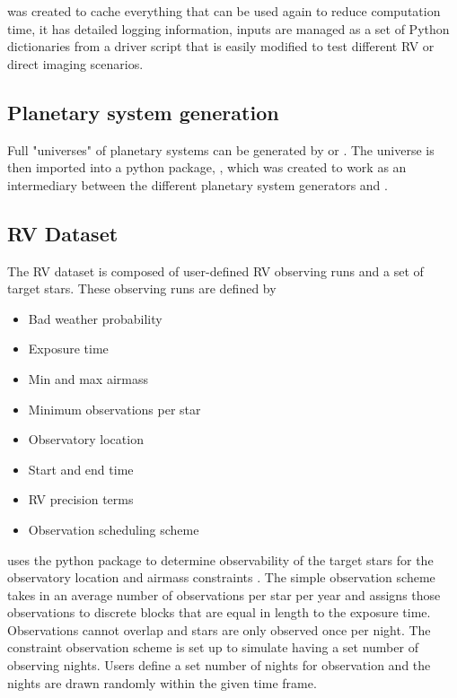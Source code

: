  was created to cache everything that can be used again to
reduce computation time, it has detailed logging information, inputs are
managed as a set of Python dictionaries from a driver script that is easily
modified to test different RV or direct imaging scenarios.

\subsection{Planetary system generation}

Full "universes" of planetary systems can be generated by  or
 \citep{starkExoVistaSuitePlanetary2022}. The universe is then
imported into a python package, , which was created to work as
an intermediary between the different planetary system generators and
.

\subsection{RV Dataset}

The RV dataset is composed of user-defined RV observing runs and a set of
target stars. These observing runs are defined by
\begin{itemize}
  \item Bad weather probability
  \item Exposure time
  \item Min and max airmass
  \item Minimum observations per star
  \item Observatory location
  \item Start and end time
  \item RV precision terms
  \item Observation scheduling scheme
\end{itemize}
 uses the  python package to
determine observability of the target stars for the observatory location and
airmass constraints \citep{morrisAstroplanOpen2018}. The simple observation
scheme takes in an average number of observations per star per year and assigns
those observations to discrete blocks that are equal in length to the exposure
time. Observations cannot overlap and stars are only observed once per night.
The constraint observation scheme is set up to simulate having a set number of
observing nights. Users define a set number of nights for observation and the
nights are drawn randomly within the given time frame.


